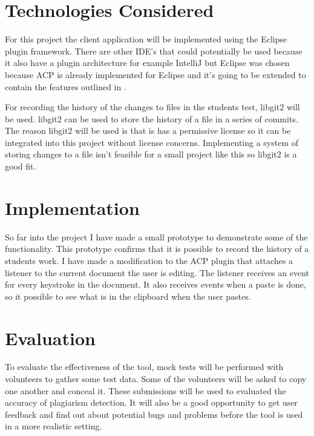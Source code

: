\documentclass[twocolumn]{article}
\begin{document}
\section{Technologies Considered}
For this project the client application will be implemented using the Eclipse
plugin framework. There are other IDE's that could potentially be used because
it also have a plugin architecture for example IntelliJ but Eclipse was chosen
because ACP is already implemented for Eclipse and it's going to be extended to
contain the features outlined in .

For recording the history of the changes to files in the students test, libgit2
will be used. libgit2 can be used to store the history of a file in a series of
commits. The reason libgit2 will be used is that is has a permissive license so
it can be integrated into this project without license concerns. Implementing a
system of storing changes to a file isn't feasible for a small project like this
so libgit2 is a good fit.


\section{Implementation}
So far into the project I have made a small prototype to demonstrate some of the
functionality. This prototype confirms that it is possible to record the history
of a students work. I have made a modification to the ACP plugin that attaches a
listener to the current document the user is editing. The listener receives an
event for every keystroke in the document. It also receives events when a paste
is done, so it possible to see what is in the clipboard when the user pastes.

\section{Evaluation}
To evaluate the effectiveness of the tool, mock tests will be performed with
volunteers to gather some test data. Some of the volunteers will be asked to
copy one another and conceal it. These submissions will be used to evaluated the
accuracy of plagiarism detection. It will also be a good opportunity to get user
feedback and find out about potential bugs and problems before the tool is used
in a more realistic setting.
\end{document}
